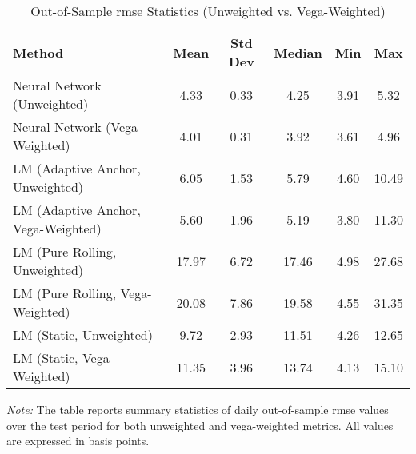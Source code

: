 \begin{table}[H]
	\centering
	\begin{threeparttable}
		\caption{Out-of-Sample \ac{rmse} Statistics (Unweighted vs. Vega-Weighted)}
		\label{tab:rmse_statistics}
		\begin{tabular}{lccccc}
			\toprule
			\textbf{Method}                     & \textbf{Mean} & \textbf{Std Dev} & \textbf{Median} & \textbf{Min} & \textbf{Max} \\
			\midrule
			Neural Network (Unweighted)         & 4.33          & 0.33             & 4.25            & 3.91         & 5.32         \\
			Neural Network (Vega-Weighted)      & 4.01          & 0.31             & 3.92            & 3.61         & 4.96         \\
			\midrule
			LM (Adaptive Anchor, Unweighted)    & 6.05          & 1.53             & 5.79            & 4.60         & 10.49        \\
			LM (Adaptive Anchor, Vega-Weighted) & 5.60          & 1.96             & 5.19            & 3.80         & 11.30        \\
			\midrule
			LM (Pure Rolling, Unweighted)       & 17.97         & 6.72             & 17.46           & 4.98         & 27.68        \\
			LM (Pure Rolling, Vega-Weighted)    & 20.08         & 7.86             & 19.58           & 4.55         & 31.35        \\
			\midrule
			LM (Static, Unweighted)             & 9.72          & 2.93             & 11.51           & 4.26         & 12.65        \\
			LM (Static, Vega-Weighted)          & 11.35         & 3.96             & 13.74           & 4.13         & 15.10        \\
			\bottomrule
		\end{tabular}
		\begin{tablenotes}
			\footnotesize
			\item \textit{Note:} The table reports summary statistics of daily out-of-sample \ac{rmse} values over the test period for both unweighted and vega-weighted metrics. All values are expressed in basis points.
		\end{tablenotes}
	\end{threeparttable}
\end{table}

